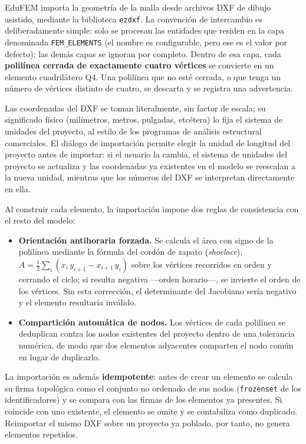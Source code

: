 EduFEM importa la geometría de la malla desde archivos DXF de dibujo asistido, mediante la biblioteca \texttt{ezdxf}. La convención de intercambio es deliberadamente simple: solo se procesan las entidades que residen en la capa denominada \texttt{FEM\_ELEMENTS} (el nombre es configurable, pero ese es el valor por defecto); las demás capas se ignoran por completo. Dentro de esa capa, cada \textbf{polilínea cerrada de exactamente cuatro vértices} se convierte en un elemento cuadrilátero Q4. Una polilínea que no esté cerrada, o que tenga un número de vértices distinto de cuatro, se descarta y se registra una advertencia.

Las coordenadas del DXF se toman literalmente, sin factor de escala; su significado físico (milímetros, metros, pulgadas, etcétera) lo fija el sistema de unidades del proyecto, al estilo de los programas de análisis estructural comerciales. El diálogo de importación permite elegir la unidad de longitud del proyecto antes de importar: si el usuario la cambia, el sistema de unidades del proyecto se actualiza y las coordenadas ya existentes en el modelo se reescalan a la nueva unidad, mientras que los números del DXF se interpretan directamente en ella.

Al construir cada elemento, la importación impone dos reglas de consistencia con el resto del modelo:

\begin{itemize}
  \item \textbf{Orientación antihoraria forzada.} Se calcula el área con signo de la polilínea mediante la fórmula del cordón de zapato (\emph{shoelace}), $A = \tfrac{1}{2}\sum_i (x_i\,y_{i+1} - x_{i+1}\,y_i)$ sobre los vértices recorridos en orden y cerrando el ciclo; si resulta negativa ---orden horario---, se invierte el orden de los vértices. Sin esta corrección, el determinante del Jacobiano sería negativo y el elemento resultaría inválido.
  \item \textbf{Compartición automática de nodos.} Los vértices de cada polilínea se deduplican contra los nodos existentes del proyecto dentro de una tolerancia numérica, de modo que dos elementos adyacentes comparten el nodo común en lugar de duplicarlo.
\end{itemize}

La importación es además \textbf{idempotente}: antes de crear un elemento se calcula su firma topológica como el conjunto no ordenado de sus nodos (\texttt{frozenset} de los identificadores) y se compara con las firmas de los elementos ya presentes. Si coincide con uno existente, el elemento se omite y se contabiliza como duplicado. Reimportar el mismo DXF sobre un proyecto ya poblado, por tanto, no genera elementos repetidos.

